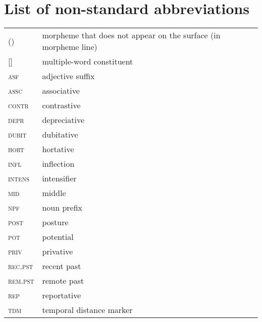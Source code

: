\documentclass[output=paper]{langsci/langscibook}
\begin{document}
\section*{List of non-standard abbreviations}%
%
\begin{tabularx}{\textwidth}{@{} l Q } 
(\hspace{5mm}) & morpheme that does not appear on the surface (in morpheme line)\\
\rule{0pt}{1ex}[\hspace{5mm}] & multiple-word constituent\\
\textsc{asf} & adjective suffix\\
\textsc{assc} & associative\\
\textsc{contr} & contrastive\\
\textsc{depr} & depreciative\\
\textsc{dubit} & dubitative\\
\textsc{hort} & hortative\\
\textsc{infl} & inflection\\
\textsc{intens} & intensifier\\
\textsc{mid} & middle\\
\textsc{npf} & noun prefix\\
\textsc{post} & posture\\
\textsc{pot} & potential\\
\textsc{priv} & privative\\
\textsc{rec.pst} & recent past\\
\textsc{rem.pst} & remote past\\
\textsc{rep} & reportative\\
\textsc{tdm} & temporal distance marker
\end{tabularx}

\printbibliography[heading=subbibliography] 
\end{document}
